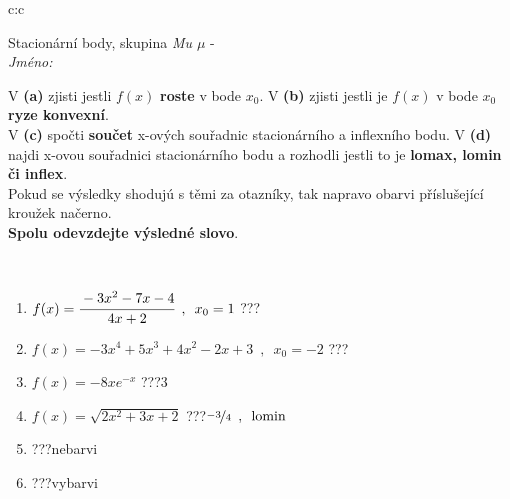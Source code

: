 \documentclass[10pt]{report}
\begin{document}
\newpage
\thispagestyle{empty}
\begin{tabular}{c:c}
\begin{minipage}[c][104.5mm][t]{0.5\linewidth}
\begin{center}
\vspace{7mm}
{\huge Stacionární body, skupina \textit{Mu $\mu$} -}\\[5mm]
\textit{Jméno:}\phantom{xxxxxxxxxxxxxxxxxxxxxxxxxxxxxxxxxxxxxxxxxxxxxxxxxxxxxxxxxxxxxxxxx}\\[5mm]
\begin{minipage}{0.95\linewidth}
\begin{center}
{\small V \textbf{(a)} zjisti jestli $f(x)$ \textbf{roste} v bode $x_0$. V \textbf{(b)} zjisti jestli je $f(x)$ v bode $x_0$ \textbf{ryze konvexní}.\\V \textbf{(c)} spočti \textbf{součet} x-ových souřadnic stacionárního a inflexního bodu. V \textbf{(d)} najdi x-ovou souřadnici stacionárního bodu a rozhodli jestli to je \textbf{lomax, lomin či inflex}.\\Pokud se výsledky shodujú s těmi za otazníky, tak napravo obarvi příslušející kroužek načerno.\\\textbf{Spolu odevzdejte výsledné slovo}}.
\end{center}
\end{minipage}
\\[1mm]
\begin{minipage}{0.79\linewidth}
\begin{center}
\begin{varwidth}{\linewidth}
\begin{enumerate}
\normalsize
\item $f(x)=\cfrac{-3x^2-7x-4}{4x+2}\enspace , \enspace x_0=1$\quad \dotfill\; ???\;\dotfill \quad {}
\item $f(x)=-3x^4+5x^3+4x^2-2x+3\enspace , \enspace x_0=-2$\quad \dotfill\; ???\;\dotfill \quad {}
\item $f(x)=-8xe^{-x}$\quad \dotfill\; ???\;\dotfill \quad $3$
\item $f(x)=\sqrt{2x^2+3x+2}$\quad \dotfill\; ???\;\dotfill \quad $\nicefrac{-3}{4}\enspace , \enspace \mathrm{lomin}$
\item \quad \dotfill\; ???\;\dotfill \quad nebarvi
\item \quad \dotfill\; ???\;\dotfill \quad vybarvi
\end{enumerate}
\end{varwidth}
\end{center}

\end{minipage}
\end{center}
\end{minipage}
\end{tabular}
\end{document}
